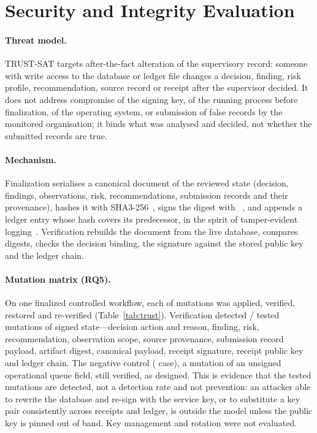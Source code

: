 \section{Security and Integrity Evaluation}
\label{sec:integrity}

\paragraph{Threat model.}
TRUST-SAT targets after-the-fact alteration of the supervisory record: someone
with write access to the database or ledger file changes a decision, finding,
risk profile, recommendation, source record or receipt after the supervisor
decided. It does not address compromise of the signing key, of the running
process before finalization, of the operating system, or submission of false
records by the monitored organisation; it binds what was analysed and decided,
not whether the submitted records are true.

\paragraph{Mechanism.}
Finalization serialises a canonical document of the reviewed state (decision,
findings, observations, risk, recommendations, submission records and their
provenance), hashes it with SHA3-256~\citep{nist2015fips202}, signs the digest with
~\citep{nist2024fips204}, and appends a ledger entry whose hash
covers its predecessor, in the spirit of tamper-evident logging~\citep{schneier1999logs,crosby2009logging}.
Verification rebuilds the document from the live database, compares digests,
checks the decision binding, the signature against the stored public key and the
ledger chain.

\paragraph{Mutation matrix (RQ5).}
On one finalized controlled workflow, each of  mutations was applied,
verified, restored and re-verified (Table~\ref{tab:trust}). Verification detected
/ tested mutations of signed state---decision action
and reason, finding, risk, recommendation, observation scope, source provenance,
submission record payload, artifact digest, canonical payload, receipt signature,
receipt public key and ledger chain. The negative control ( case), a
mutation of an unsigned operational queue field, still verified, as designed. This is evidence
that the tested mutations are detected, not a detection rate and not prevention: an
attacker able to rewrite the database and re-sign with the service key, or to
substitute a key pair consistently across receipts and ledger, is outside the model
unless the public key is pinned out of band. Key management and
rotation were not evaluated.

